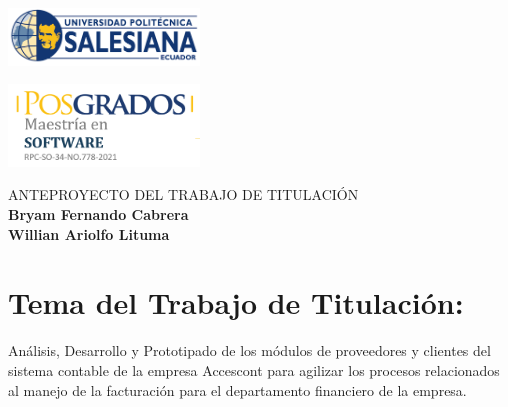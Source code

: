\documentclass{article}
\begin{document}
\colorbox{white!10!}{
    \begin{minipage}[t]{0.05\textwidth} %
       \begin{flushright}
        \includegraphics[width=2in]{logo UPS.png}
       \end{flushright}
    \end{minipage}
    \begin{minipage}[H]{0.62 \textwidth} %
        \begin{center}
         
        \end{center}
     \end{minipage}
    \begin{minipage}[t]{0.05 \textwidth}
        \begin{flushleft}
        \hspace{10.25cm}
            \includegraphics[width=2in]{Posgrados.png}
        \end{flushleft}
    \end{minipage}
}

\vspace{0.1cm}
\begin{center}
{\large\textsc{ANTEPROYECTO DEL TRABAJO DE TITULACIÓN}} \\
\vspace{0.5cm}
{ \large \textbf{Bryam Fernando Cabrera}} \\ 
\vspace{0.25cm}
{ \large \textbf{Willian Ariolfo  Lituma}}
\end{center}
\vspace{0.1cm}

\section{Tema del Trabajo de Titulación:  }
\begin{center}
    Análisis, Desarrollo y Prototipado de los módulos de proveedores y clientes del sistema contable de la empresa Accescont para agilizar los procesos relacionados al manejo de la facturación para el departamento financiero de la empresa.
\end{center}
\end{document}
